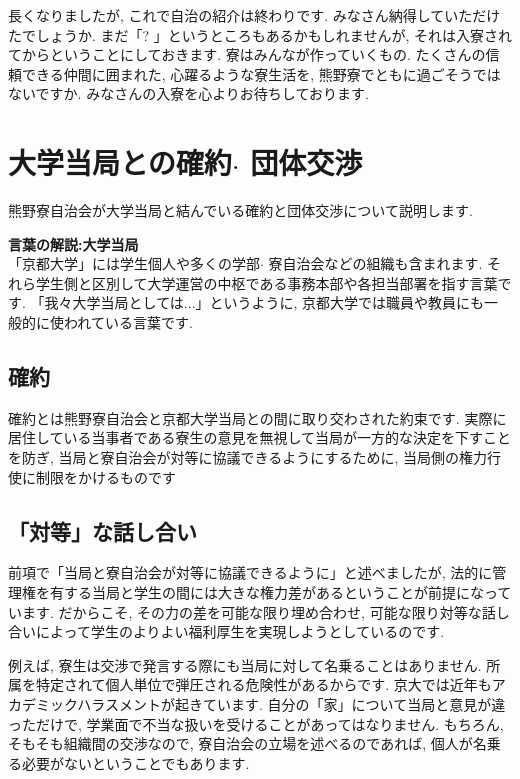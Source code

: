 \documentclass[10pt,b5jsbook,dvips,dvipdfmx,openany]{jsbook}
\theoremstyle{definition}
\begin{document}
 		長くなりましたが, これで自治の紹介は終わりです. みなさん納得していただけたでしょうか. まだ「? 」というところもあるかもしれませんが, それは入寮されてからということにしておきます. 寮はみんなが作っていくもの. たくさんの信頼できる仲間に囲まれた, 心躍るような寮生活を, 熊野寮でともに過ごそうではないですか. みなさんの入寮を心よりお待ちしております.

\newpage %
	\section{大学当局との確約$ \cdot $ 団体交渉}
	熊野寮自治会が大学当局と結んでいる確約と団体交渉について説明します.

	\begin{shadebox}
	\textbf{言葉の解説:大学当局} \\
	「京都大学」には学生個人や多くの学部$ \cdot $ 寮自治会などの組織も含まれます. それら学生側と区別して大学運営の中枢である事務本部や各担当部署を指す言葉です. 「我々大学当局としては...」というように, 京都大学では職員や教員にも一般的に使われている言葉です.
	\end{shadebox}

		\subsection{確約}
		確約とは熊野寮自治会と京都大学当局との間に取り交わされた約束です. 実際に居住している当事者である寮生の意見を無視して当局が一方的な決定を下すことを防ぎ, 当局と寮自治会が対等に協議できるようにするために, 当局側の権力行使に制限をかけるものです

		\subsection{「対等」な話し合い}
 		前項で「当局と寮自治会が対等に協議できるように」と述べましたが, 法的に管理権を有する当局と学生の間には大きな権力差があるということが前提になっています. だからこそ, その力の差を可能な限り埋め合わせ, 可能な限り対等な話し合いによって学生のよりよい福利厚生を実現しようとしているのです.

		例えば, 寮生は交渉で発言する際にも当局に対して名乗ることはありません. 所属を特定されて個人単位で弾圧される危険性があるからです. 京大では近年もアカデミックハラスメントが起きています. 自分の「家」について当局と意見が違っただけで, 学業面で不当な扱いを受けることがあってはなりません.
もちろん, そもそも組織間の交渉なので, 寮自治会の立場を述べるのであれば, 個人が名乗る必要がないということでもあります.
\end{document}
